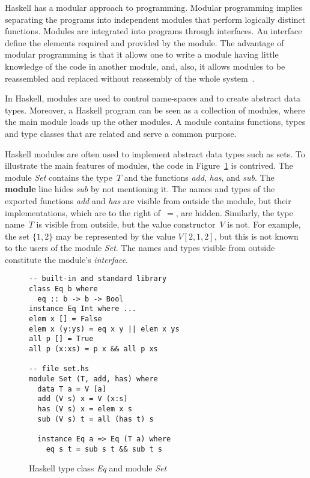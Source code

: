 \documentclass[a4paper,12pt,oneside,fleqn]{book} %
\begin{document}

Haskell has a modular approach to programming. Modular programming implies
separating the programs into independent modules that perform logically
distinct functions. Modules are integrated into programs through
interfaces. An interface define the elements required and provided by the
module. The advantage of modular programming is that it allows one to write
a module having little knowledge of the code in another module, and, also,
it allows modules to be reassembled and replaced without reassembly of the
whole system~\cite{DBLP:journals/cacm/Parnas72a}.

In Haskell, modules are used to control name-spaces and to create abstract
data types. Moreover, a Haskell program can be seen as a collection of
modules, where the main module loads up the other modules. A module
contains functions, types and type classes that are related and serve a
common purpose.

Haskell modules are often used to implement abstract data types such as
sets.  To illustrate the main features of modules, the code in
Figure~\ref{fig:haskell} is contrived.  The module \textit{Set} contains
the type~$T$ and the functions \textit{add}, \textit{has}, and
\textit{sub}. The \textbf{module} line hides \textit{sub} by not mentioning
it. The names and types of the exported functions \textit{add} and
\textit{has} are visible from outside the module, but their
implementations, which are to the right of~$=$, are hidden.  Similarly, the
type name~$T$ is visible from outside, but the value constructor~$V$ is
not. For example, the set $\{1,2\}$ may be represented by the value
$V[2,1,2]$, but this is not known to the users of the module \textit{Set}.
The names and types visible from outside constitute the module's
\emph{interface}.

\begin{figure}\footnotesize %
\begin{verbatim}
-- built-in and standard library
class Eq b where
  eq :: b -> b -> Bool
instance Eq Int where ...
elem x [] = False
elem x (y:ys) = eq x y || elem x ys
all p [] = True
all p (x:xs) = p x && all p xs

-- file set.hs
module Set (T, add, has) where
  data T a = V [a]
  add (V s) x = V (x:s)
  has (V s) x = elem x s
  sub (V s) t = all (has t) s

  instance Eq a => Eq (T a) where
    eq s t = sub s t && sub t s
\end{verbatim}
\caption{Haskell type class \textit{Eq} and module \textit{Set}}
\label{fig:haskell}
\end{figure} %
\end{document}
